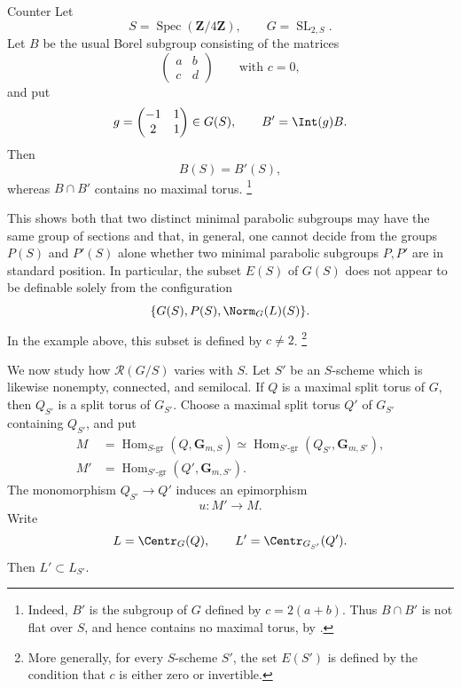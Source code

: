 \begin{sgastatement}{Counter}
Let
\[
 S=\operatorname{Spec}(\mathbf Z/4\mathbf Z),
 \qquad G=\operatorname{SL}_{2,S}.
\]
Let \(B\) be the usual Borel subgroup consisting of the matrices
\[
 \begin{pmatrix}a&b\\c&d\end{pmatrix}
 \qquad\text{with }c=0,
\]
and put
\[
 g=\begin{pmatrix}-1&1\\2&1\end{pmatrix}\in G(S),
 \qquad B'=\Int(g)B.
\]
Then
\[
 B(S)=B'(S),
\]
whereas \(B\cap B'\) contains no maximal torus.
\footnote{Indeed, \(B'\) is the subgroup of \(G\) defined by
\(c=2(a+b)\).  Thus \(B\cap B'\) is not flat over \(S\), and hence
contains no maximal torus, by .}

This shows both that two distinct minimal parabolic subgroups may
have the same group of sections and that, in general, one cannot
decide from the groups \(P(S)\) and \(P'(S)\) alone whether two
minimal parabolic subgroups \(P,P'\) are in standard position.  In
particular, the subset \(E(S)\) of \(G(S)\) does not appear to be
definable solely from the configuration
\[
 \{G(S),P(S),\Norm_G(L)(S)\}.
\]
In the example above, this subset is defined by \(c\ne2\).
\footnote{More generally, for every \(S\)-scheme \(S'\), the set
\(E(S')\) is defined by the condition that \(c\) is either zero or
invertible.}
\end{sgastatement}



We now study how \(\mathcal R(G/S)\) varies with \(S\).  Let \(S'\)
be an \(S\)-scheme which is likewise nonempty, connected, and
semilocal.  If \(Q\) is a maximal split torus of \(G\), then
\(Q_{S'}\) is a split torus of \(G_{S'}\).  Choose a maximal split
torus \(Q'\) of \(G_{S'}\) containing \(Q_{S'}\), and put
\[
\begin{aligned}
 M&=\operatorname{Hom}_{S\text{-}\mathrm{gr}}
       (Q,\mathbf G_{m,S})
   \simeq
   \operatorname{Hom}_{S'\text{-}\mathrm{gr}}
       (Q_{S'},\mathbf G_{m,S'}),\\
 M'&=\operatorname{Hom}_{S'\text{-}\mathrm{gr}}
       (Q',\mathbf G_{m,S'}).
\end{aligned}
\]
The monomorphism \(Q_{S'}\to Q'\) induces an epimorphism
\[
 u:M'\longrightarrow M.
\]
Write
\[
 L=\Centr_G(Q),\qquad L'=\Centr_{G_{S'}}(Q').
\]
Then \(L'\subset L_{S'}\).

